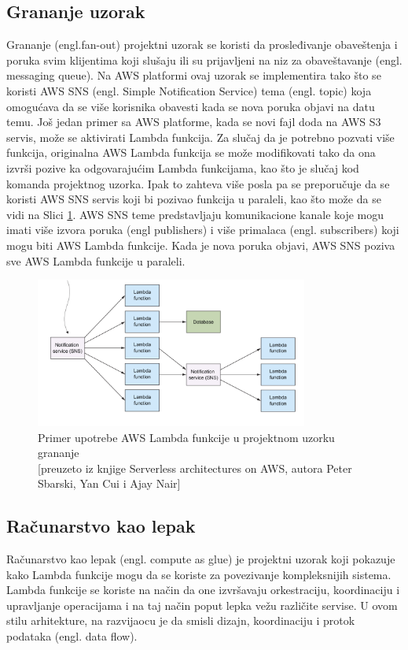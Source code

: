 \documentclass[12pt,oneside]{memoir}
\begin{document}
\subsection{Grananje uzorak} %
Grananje (engl.fan-out) projektni uzorak se koristi da prosleđivanje obaveštenja i poruka svim klijentima koji slušaju ili su prijavljeni na niz za obaveštavanje (engl. messaging queue). Na AWS platformi ovaj uzorak se implementira tako što se koristi AWS SNS (engl. Simple Notification Service) tema (engl. topic) koja omogućava da se više korisnika obavesti kada se nova poruka objavi na datu temu. Još jedan primer sa AWS platforme, kada se novi fajl doda na AWS S3 servis, može se aktivirati Lambda funkcija. Za slučaj da je potrebno pozvati više funkcija, originalna AWS Lambda funkcija se može modifikovati tako da ona izvrši pozive ka odgovarajućim Lambda funkcijama, kao što je slučaj kod komanda projektnog uzorka. Ipak to zahteva više posla pa se preporučuje da se koristi AWS SNS servis koji bi pozivao funkcija u paraleli, kao što može da se vidi na Slici \ref{fig:grananje}. AWS SNS teme predstavljaju komunikacione kanale koje mogu imati više izvora poruka (engl publishers) i više primalaca (engl. subscribers) koji mogu biti AWS Lambda funkcije. Kada je nova poruka objavi, AWS SNS poziva sve AWS Lambda funkcije u paraleli.

\begin{figure}[!ht]
  \centering
  \includegraphics[width=0.8\textwidth]{Slika 15.png}
  \caption{Primer upotrebe AWS Lambda funkcije u projektnom uzorku grananje\\\footnotesize[preuzeto iz knjige Serverless architectures on AWS, autora Peter Sbarski, Yan Cui i Ajay Nair]}
  \label{fig:grananje}
\end{figure}

\subsection{Računarstvo kao lepak} %
Računarstvo kao lepak (engl. compute as glue) je projektni uzorak koji pokazuje kako Lambda funkcije mogu da se koriste za povezivanje kompleksnijih sistema. Lambda funkcije se koriste na način da one izvršavaju orkestraciju, koordinaciju i upravljanje operacijama i na taj način poput lepka vežu različite servise. U ovom stilu arhitekture, na razvijaocu je da smisli dizajn, koordinaciju i protok podataka (engl. data flow). 
 
\end{document}
